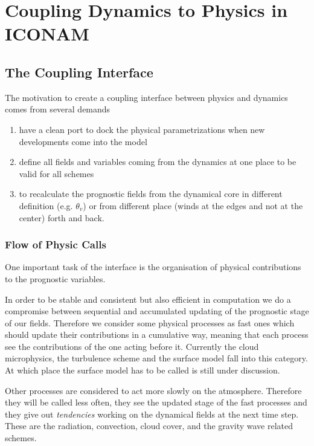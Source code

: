 \chapter{Coupling Dynamics to Physics in ICONAM}

\section{The Coupling Interface}
The motivation to create a coupling interface between physics and dynamics comes from several demands
\begin{enumerate}
\item have a clean port to dock the physical parametrizations when new developments come into the model

\item define all fields and variables coming from the dynamics at one place to be valid for all schemes

\item to recalculate the prognostic fields from the dynamical core in different definition (e.g. $\theta_v$) or from different place (winds at the edges and not at the center) forth and back.

\end{enumerate}

\subsection{Flow of Physic Calls}

One important task of the interface is the organisation of physical contributions to the prognostic variables.

In order to be stable and consistent but also efficient in computation we do a compromise between sequential and accumulated updating of the prognostic stage of our fields. Therefore we consider some physical processes as fast ones which should update their contributions in a cumulative way, meaning that each process see the contributions of the one acting before it. Currently the cloud microphysics, the turbulence scheme and the surface model fall into this category.\\

At which place the surface model has to be called is still under discussion.

Other processes are considered to act more slowly on the atmosphere. Therefore they will be called less often, they see the updated stage of the fast processes and  they give out \emph{tendencies} working on the dynamical fields at the next time step. These are the radiation, convection, cloud cover, and the gravity wave related schemes.\\

